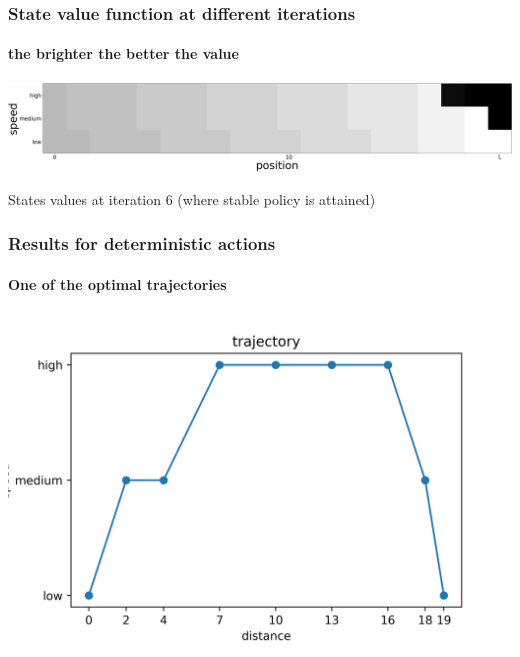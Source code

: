 \documentclass[dvipsnames,svgnames]{beamer}
\begin{document}
\begin{frame}
\frametitle{State value function at different iterations}
\framesubtitle{the brighter the better the value}

\centering
\includegraphics[scale=0.12]{img/value6.jpg}\\
\begin{block}{}
\centering
States values at iteration $6$ (where stable policy is attained)
\end{block}

\end{frame}



\begin{frame}
\frametitle{Results for deterministic actions}
\framesubtitle{One of the optimal trajectories}
\centering
\includegraphics[scale=0.5]{img/trajectory.jpg}
\end{frame}
\end{document}

